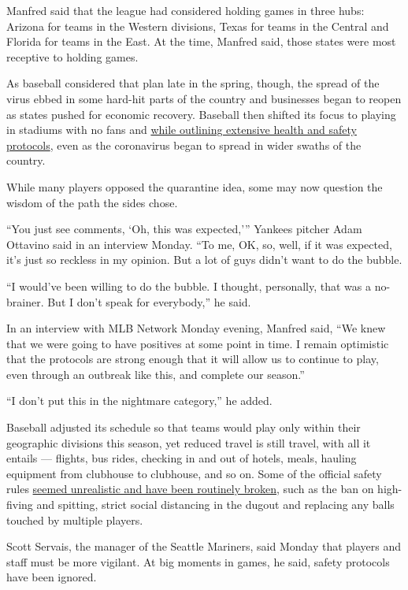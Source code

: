 Manfred said that the league had considered holding games in three hubs:
Arizona for teams in the Western divisions, Texas for teams in the
Central and Florida for teams in the East. At the time, Manfred said,
those states were most receptive to holding games.

As baseball considered that plan late in the spring, though, the spread
of the virus ebbed in some hard-hit parts of the country and businesses
began to reopen as states pushed for economic recovery. Baseball then
shifted its focus to playing in stadiums with no fans and
\href{https://www.nytimes3xbfgragh.onion/2020/06/24/sports/baseball/mlb-coronavirus-rules.html}{while
outlining extensive health and safety protocols}, even as the
coronavirus began to spread in wider swaths of the country.

While many players opposed the quarantine idea, some may now question
the wisdom of the path the sides chose.

``You just see comments, `Oh, this was expected,''' Yankees pitcher Adam
Ottavino said in an interview Monday. ``To me, OK, so, well, if it was
expected, it's just so reckless in my opinion. But a lot of guys didn't
want to do the bubble.

``I would've been willing to do the bubble. I thought, personally, that
was a no-brainer. But I don't speak for everybody,'' he said.

In an interview with MLB Network Monday evening, Manfred said, ``We knew
that we were going to have positives at some point in time. I remain
optimistic that the protocols are strong enough that it will allow us to
continue to play, even through an outbreak like this, and complete our
season.''

``I don't put this in the nightmare category,'' he added.

Baseball adjusted its schedule so that teams would play only within
their geographic divisions this season, yet reduced travel is still
travel, with all it entails --- flights, bus rides, checking in and out
of hotels, meals, hauling equipment from clubhouse to clubhouse, and so
on. Some of the official safety rules
\href{https://www.nytimes3xbfgragh.onion/2020/07/17/sports/baseball/baseball-mlb-coronavirus-spitting.html}{seemed
unrealistic and have been routinely broken}, such as the ban on
high-fiving and spitting, strict social distancing in the dugout and
replacing any balls touched by multiple players.

Scott Servais, the manager of the Seattle Mariners, said Monday that
players and staff must be more vigilant. At big moments in games, he
said, safety protocols have been ignored.


